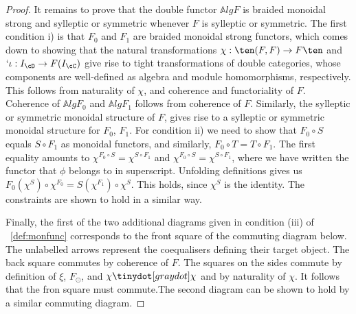 \begin{proof}
It remains to prove that the double functor $\mathbb{A}lgF$ is braided monoidal strong and sylleptic or symmetric whenever $F$ is sylleptic or symmetric. The first condition i) is that $F_0$ and $F_1$ are braided monoidal strong functors, which comes down to showing that the natural transformations $\chi: \ten (F,F) \rightarrow  F\ten$ and $`\iota: I_{\cD} \rightarrow F(I_{\cC})$ give rise to tight transformations of double categories, whose components are well-defined as algebra and module homomorphisms, respectively. This follows from naturality of $\chi$, and coherence and functoriality of $F$. Coherence of $\mathbb{A}lgF_0$ and $\mathbb{A}lgF_1$ follows from coherence of $F$. Similarly, the sylleptic or symmetric monoidal structure of $F$, gives rise to a sylleptic or symmetric monoidal structure for $F_0$, $F_1$. For condition ii) we need to show that $F_0 \circ S$ equals $S \circ F_1$ as monoidal functors, and similarly, $F_0 \circ T = T \circ F_1$. The first equality amounts to  $\chi^{F_0 \circ S} = \chi^{S \circ F_1}$ and $\chi^{F_0 \circ S} = \chi^{S \circ F_1}$, where we have written the functor that $\phi$ belongs to in superscript. Unfolding definitions gives us $F_0(\chi^{S}) \circ \chi^{F_0} = S(\chi^{F_1}) \circ \chi^{S}$. This holds, since $\chi^S$ is the identity. The constraints are shown to hold in a similar way.

Finally, the first of the two additional diagrams given in condition (iii) of ~\ref{def:monfunc} corresponds to the front square of the commuting diagram below. The unlabelled arrows represent the coequalisers defining their target object. The back square commutes by coherence of $F$. The squares on the sides commute by definition of $\xi$, $F_{\odot}$, and $\chi \tinydot[gray dot] \chi$ and by naturality of $\chi$. It follows that the fron square must commute.The second diagram can be shown to hold by a similar commuting diagram.




\end{proof}
